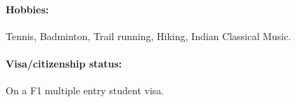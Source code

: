 \documentclass[10pt,fleqn]{article}
\begin{document}
\vspace{-20pt}
\paragraph*{Hobbies:} Tennis, Badminton, Trail running, Hiking, Indian Classical Music.
\paragraph*{Visa/citizenship status:} On a F1 multiple entry student visa. 
\end{document}
